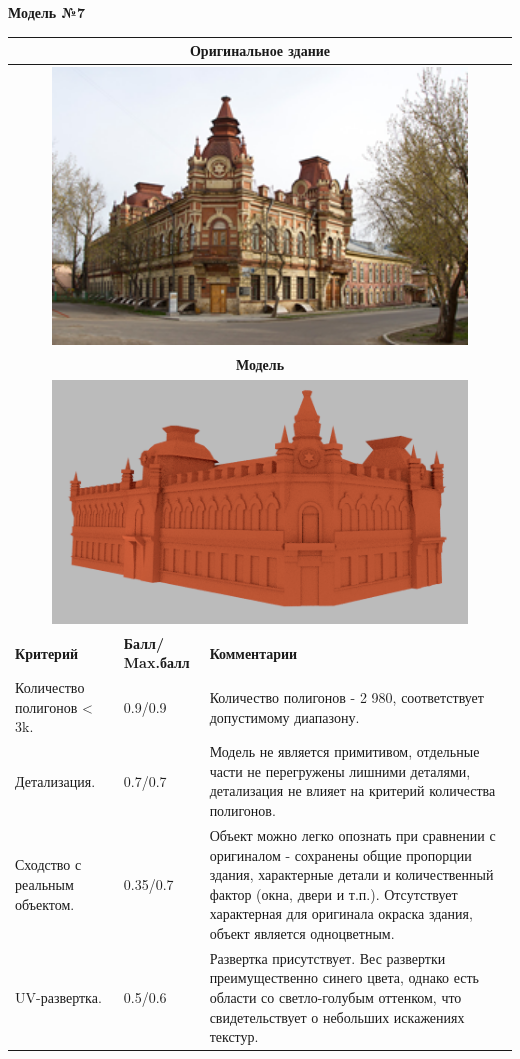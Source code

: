 \begin{center}
    \textbf{Модель №7}
\end{center}

\begin{longtable}{|p{4cm}|p{2.5cm}|p{7.5cm}|}
    \hline
    \multicolumn{3}{|c|}{\textbf{Оригинальное здание} } \\
    \hline
    \multicolumn{3}{|c|}{\includegraphics[width=11cm]{6}} \\
    \hline
    \multicolumn{3}{|c|}{\textbf{Модель}} \\
    \hline
    \multicolumn{3}{|c|}{\includegraphics[width=11cm]{src/model_7}} \\
    \hline
    \textbf{Критерий} & \textbf{Балл/ Max.балл} & \textbf{Комментарии} \\
    \hline
    Количество полигонов < 3k. & 0.9/0.9 & Количество полигонов - 2 980, соответствует допустимому диапазону. \\
    \hline
    Детализация. & 0.7/0.7 & Модель не является примитивом, отдельные части не перегружены лишними деталями, детализация не влияет на критерий количества полигонов. \\
    \hline
    Сходство с реальным объектом. & 0.35/0.7 & Объект можно легко опознать при сравнении с оригиналом - сохранены общие пропорции здания, характерные детали и количественный фактор (окна, двери и т.п.). Отсутствует характерная для оригинала окраска здания, объект является одноцветным. \\
    \hline
    UV-развертка. & 0.5/0.6 & Развертка присутствует. Вес развертки преимущественно синего цвета, однако есть области со светло-голубым оттенком, что свидетельствует о небольших искажениях текстур. 


\end{longtable}
